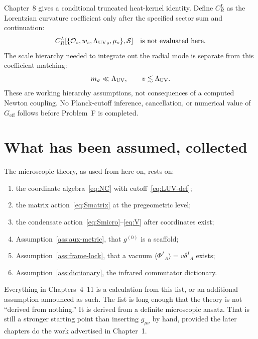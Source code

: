 Chapter~8 gives a conditional truncated heat-kernel identity. Define
\(C_R^L\) as the Lorentzian curvature coefficient only after the
specified sector sum and continuation:
\begin{equation}
  \label{eq:Geff-again}
  C_R^L[\{\mathcal O_s,w_s,{\Lambda_{\mathrm{UV}}}_s,\mu_s\},\mathcal S]
  \quad\text{is not evaluated here.}
\end{equation}
The scale hierarchy needed to integrate out the radial mode is
separate from this coefficient matching:
\begin{equation}
  \label{eq:scale-ineq}
  m_\sigma\ll\Lambda_{\mathrm{UV}},
  \qquad
  v\lesssim\Lambda_{\mathrm{UV}}.
\end{equation}
These are working hierarchy assumptions, not consequences of a
computed Newton coupling. No Planck-cutoff inference, cancellation,
or numerical value of \(G_{\mathrm{eff}}\) follows before Problem~F
is completed.

\section{What has been assumed, collected}
\label{sec:ch3-assumptions}

The microscopic theory, as used from here on, rests on:

\begin{enumerate}
  \item the coordinate algebra~\eqref{eq:NC} with cutoff~\eqref{eq:LUV-def};
  \item the matrix action~\eqref{eq:Smatrix} at the pregeometric level;
  \item the condensate action~\eqref{eq:Smicro}--\eqref{eq:V} after
        coordinates exist;
  \item Assumption~\ref{ass:aux-metric}, that \(g^{(0)}\) is a scaffold;
  \item Assumption~\ref{ass:frame-lock}, that a vacuum
        \(\langle\Phi^I{}_A\rangle=v\delta^I{}_A\) exists;
  \item Assumption~\ref{ass:dictionary}, the infrared commutator
        dictionary.
\end{enumerate}

Everything in Chapters~4--11 is a calculation from this list, or an
additional assumption announced as such. The list is long enough that
the theory is not ``derived from nothing.'' It is derived from a
definite microscopic ansatz. That is still a stronger starting point
than inserting \(g_{\mu\nu}\) by hand, provided the later chapters
do the work advertised in Chapter~1.

